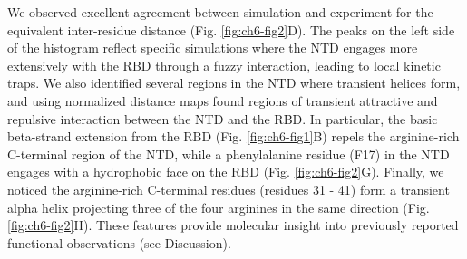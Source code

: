 \documentclass[../main.tex]{subfiles}
\begin{document}
        We observed excellent agreement between simulation and experiment for the equivalent inter-residue distance (Fig. \ref{fig:ch6-fig2}D). The peaks on the left side of the histogram reflect specific simulations where the NTD engages more extensively with the RBD through a fuzzy interaction, leading to local kinetic traps\cite{Tompa2008-tn}. We also identified several regions in the NTD where transient helices form, and using normalized distance maps found regions of transient attractive and repulsive interaction between the NTD and the RBD. In particular, the basic beta-strand extension from the RBD (Fig. \ref{fig:ch6-fig1}B) repels the arginine-rich C-terminal region of the NTD, while a phenylalanine residue (F17) in the NTD engages with a hydrophobic face on the RBD (Fig. \ref{fig:ch6-fig2}G). Finally, we noticed the arginine-rich C-terminal residues (residues 31 - 41) form a transient alpha helix projecting three of the four arginines in the same direction (Fig. \ref{fig:ch6-fig2}H). These features provide molecular insight into previously reported functional observations (see Discussion).
\end{document}
